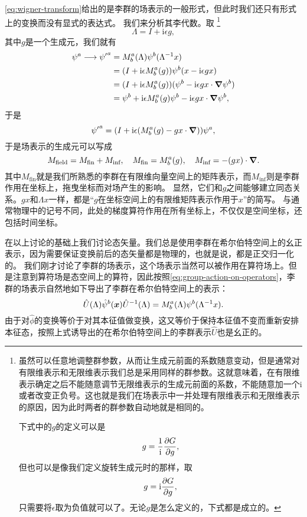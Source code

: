 \documentclass[UTF8, a4paper]{ctexart}
\newcommand*{\ii}{\mathrm{i}}
\begin{document}
\eqref{eq:wigner-transform}给出的是李群的场表示的一般形式，但此时我们还只有形式上的变换而没有显式的表达式。
我们来分析其李代数。取%
\footnote{虽然可以任意地调整群参数，从而让生成元前面的系数随意变动，但是通常对有限维表示和无限维表示我们总是采用同样的群参数。这就意味着，在有限维表示确定之后不能随意调节无限维表示的生成元前面的系数，不能随意加一个$\ii$或者改变正负号。这也就是我们在场表示中一并处理有限维表示和无限维表示的原因，因为此时两者的群参数自动地就是相同的。

下式中的$g$的定义可以是\[
    g = \frac{1}{\ii} \pdv{G}{g},
\]
但也可以是像我们定义旋转生成元时的那样，取
\[
    g = \ii \pdv{G}{g},
\]
只需要将$\epsilon$取为负值就可以了。无论$g$是怎么定义的，下式都是成立的。}%
\[
    \Lambda = I + \ii \epsilon g,
\]
其中$g$是一个生成元，我们就有
\[
    \begin{aligned}
        \psi^a \longrightarrow {\psi'}^a &= M^a_b (\Lambda) \psi^b (\Lambda^{-1} x) \\
        &= (I + \ii \epsilon M^a_b(g)) \psi^b (x - \ii \epsilon g x) \\
        &= (I + \ii \epsilon M^a_b(g)) (\psi^b - \ii \epsilon g x \cdot \grad{\psi^b}) \\
        &= \psi^b + \ii \epsilon M^a_b(g) \psi^b - \ii \epsilon g x \cdot \grad{\psi^b},
    \end{aligned}
\]
于是
\[
    {\psi'}^a = (I + \ii \epsilon  (M^a_b(g) - g x \cdot \grad)) \psi^a,
\]
于是场表示的生成元可以写成
\begin{equation}
    M_\text{field} = M_\text{fin} + M_\text{inf}, \quad M_\text{fin} = M^a_b(g), \quad M_\text{inf} = - (g x) \cdot \grad.
    \label{eq:fin-and-inf-rep}
\end{equation}
其中$M_\text{fin}$就是我们所熟悉的李群在有限维向量空间上的矩阵表示，而$M_\text{inf}$则是李群作用在坐标上，拖曳坐标而对场产生的影响。
显然，它们和$g$之间能够建立同态关系。$gx$和$\Lambda x$一样，都是“$g$在坐标空间上的有限维矩阵表示作用于$x$”的简写。
与通常物理中的记号不同，此处的梯度算符作用在所有坐标上，不仅仅是空间坐标，还包括时间坐标。

在以上讨论的基础上我们讨论态矢量。我们总是使用李群在希尔伯特空间上的幺正表示，因为需要保证变换前后的态矢量都是物理的，也就是说，都是正交归一化的。
我们刚才讨论了李群的场表示，这个场表示当然可以被作用在算符场上。但是注意到算符场是态空间上的算符，因此按照\eqref{eq:group-action-on-operators}，李群的场表示自然地如下导出了李群在希尔伯特空间上的表示：
\begin{equation}
    \hat{U}(\Lambda) \hat{\psi}^b(\vb*{x}) \hat{U}^{-1}(\Lambda) = M^a_b (\Lambda) \psi^b (\Lambda^{-1} x).
    \label{eq:field-rep-and-state-rep-lie-group}
\end{equation}
由于对$\hat{\phi}$的变换等价于对其本征值做变换，这又等价于保持本征值不变而重新安排本征态，按照上式诱导出的在希尔伯特空间上的李群表示$\hat{U}$也是幺正的。
\end{document}
